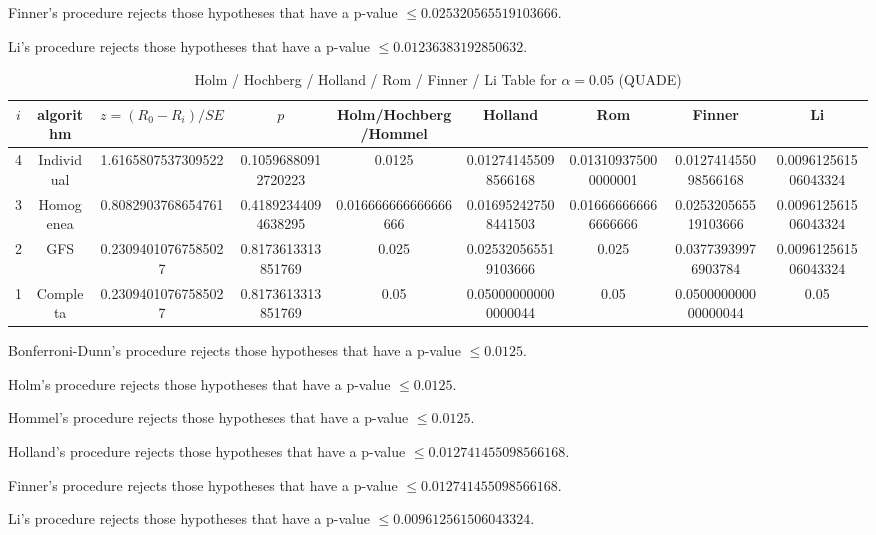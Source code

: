 \documentclass[a4paper,10pt]{article}
\begin{document}
\begin{landscape}
Finner's procedure rejects those hypotheses that have a p-value $\le0.025320565519103666$.


Li's procedure rejects those hypotheses that have a p-value $\le0.01236383192850632$.



\newpage

\begin{table}[!htp]
\centering\scriptsize
\caption{Holm / Hochberg / Holland / Rom / Finner / Li Table for $\alpha=0.05$ (QUADE)}
\begin{tabular}{ccccccccc}
$i$&algorithm&$z=(R_0 - R_i)/SE$&$p$&Holm/Hochberg/Hommel&Holland&Rom&Finner&Li\\
\hline
4&Individual&1.6165807537309522&0.10596880912720223&0.0125&0.012741455098566168&0.013109375000000001&0.012741455098566168&0.009612561506043324\\
3&Homogenea&0.8082903768654761&0.41892344094638295&0.016666666666666666&0.016952427508441503&0.016666666666666666&0.025320565519103666&0.009612561506043324\\
2&GFS&0.23094010767585027&0.8173613313851769&0.025&0.025320565519103666&0.025&0.03773939976903784&0.009612561506043324\\
1&Completa&0.23094010767585027&0.8173613313851769&0.05&0.050000000000000044&0.05&0.050000000000000044&0.05\\
\hline
\end{tabular}
\end{table}
Bonferroni-Dunn's procedure rejects those hypotheses that have a p-value $\le0.0125$.


Holm's procedure rejects those hypotheses that have a p-value $\le0.0125$.


Hommel's procedure rejects those hypotheses that have a p-value $\le0.0125$.


Holland's procedure rejects those hypotheses that have a p-value $\le0.012741455098566168$.


Finner's procedure rejects those hypotheses that have a p-value $\le0.012741455098566168$.


Li's procedure rejects those hypotheses that have a p-value $\le0.009612561506043324$.



\newpage


\end{landscape}
\end{document}
